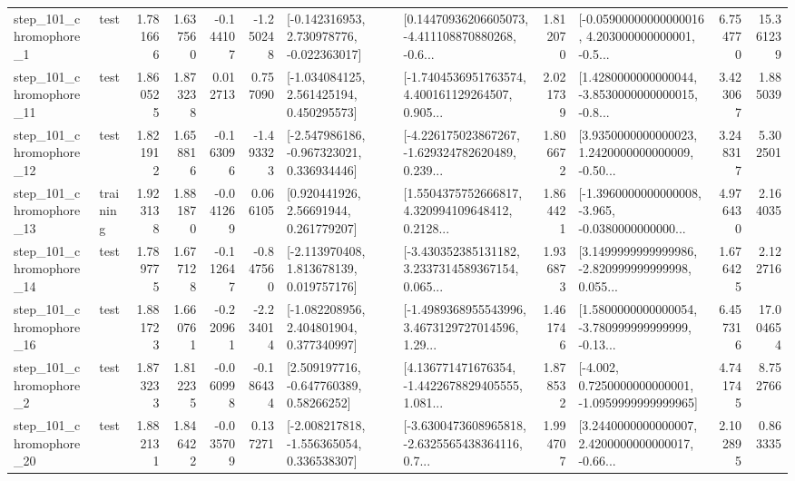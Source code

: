 \begin{tabular}{llrrrrllrlrr}
   step\_101\_chromophore\_1 &      test &      1.781666 &    1.637560 &     -0.144107 & -1.250248 &   [-0.142316953, 2.730978776, -0.022363017] &  [0.14470936206605073, -4.411108870880268, -0.6... &       1.812070 &  [-0.05900000000000016, 4.203000000000001, -0.5... &            6.754770 &         15.361239 \\
  step\_101\_chromophore\_11 &      test &      1.860525 &    1.873238 &      0.012713 &  0.757090 &    [-1.034084125, 2.561425194, 0.450295573] &  [-1.7404536951763574, 4.400161129264507, 0.905... &       2.021739 &  [1.4280000000000044, -3.8530000000000015, -0.8... &            3.423067 &          1.885039 \\
  step\_101\_chromophore\_12 &      test &      1.821912 &    1.658816 &     -0.163096 & -1.493323 &   [-2.547986186, -0.967323021, 0.336934446] &  [-4.226175023867267, -1.629324782620489, 0.239... &       1.806672 &  [3.9350000000000023, 1.2420000000000009, -0.50... &            3.248317 &          5.302501 \\
  step\_101\_chromophore\_13 &  training &      1.923138 &    1.881870 &     -0.041269 &  0.066105 &      [0.920441926, 2.56691944, 0.261779207] &  [1.5504375752666817, 4.320994109648412, 0.2128... &       1.864421 &  [-1.3960000000000008, -3.965, -0.0380000000000... &            4.976430 &          2.164035 \\
  step\_101\_chromophore\_14 &      test &      1.789775 &    1.677128 &     -0.112647 & -0.847560 &    [-2.113970408, 1.813678139, 0.019757176] &  [-3.430352385131182, 3.2337314589367154, 0.065... &       1.936873 &  [3.1499999999999986, -2.820999999999998, 0.055... &            1.676425 &          2.122716 \\
  step\_101\_chromophore\_16 &      test &      1.881723 &    1.660761 &     -0.220961 & -2.234014 &    [-1.082208956, 2.404801904, 0.377340997] &  [-1.4989368955543996, 3.4673129727014596, 1.29... &       1.461746 &  [1.5800000000000054, -3.780999999999999, -0.13... &            6.457316 &         17.004654 \\
   step\_101\_chromophore\_2 &      test &      1.873233 &    1.812235 &     -0.060998 & -0.186434 &     [2.509197716, -0.647760389, 0.58266252] &  [4.136771471676354, -1.4422678829405555, 1.081... &       1.878532 &  [-4.002, 0.7250000000000001, -1.0959999999999965] &            4.741745 &          8.752766 \\
  step\_101\_chromophore\_20 &      test &      1.882131 &    1.846422 &     -0.035709 &  0.137271 &   [-2.008217818, -1.556365054, 0.336538307] &  [-3.6300473608965818, -2.6325565438364116, 0.7... &       1.994707 &  [3.2440000000000007, 2.4200000000000017, -0.66... &            2.102895 &          0.863335 \\

\end{tabular}
